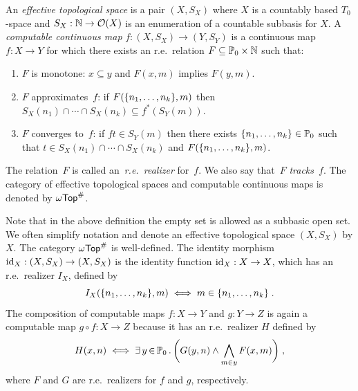 \begin{definition}
  \label{def:eff_top}%
  An \emph{effective topological space} is a pair $(X, S_X)$ where $X$
  is a countably based $T_0$-space and $S_X: \mathbb{N} \to \mathcal{O}(X)$ is
  an enumeration of a countable subbasis for $X$.
  A \emph{computable continuous map} $f: (X, S_X) \to (Y, S_Y)$ is a
  continuous map $f: X \to Y$ for which there exists an
  r.e.~relation $F \subseteq \mathbb{P}_0 \times \mathbb{N}$ such that:
  \begin{enumerate}
  \item
    $F$ is monotone: $x \subseteq y$ and $F(x, m)$ implies $F(y, m)$.
  \item
    $F$ approximates~$f$: if $F(\{n_1, \ldots, n_k\}, m)$ then
    $S_X(n_1) \cap \cdots \cap S_X(n_k) \subseteq
    f^{*}(S_Y(m))$.
  \item
    $F$ converges to~$f$: if $f t \in S_Y(m)$ then there exists
    $\{n_1, \ldots, n_k\} \in \mathbb{P}_0$ such that $t \in S_X(n_1)
    \cap \cdots \cap S_X(n_k)$ and $F(\{n_1, \ldots, n_k\},
    m)$.
  \end{enumerate}
  The relation~$F$ is called an~\emph{r.e.~realizer} for~$f$. We also
  say that~$F$ \emph{tracks}~$f$.
  The category of effective
  topological spaces and computable continuous maps is denoted by
  $\mathsf{\omega Top}^{\#}$.
\end{definition}

Note that in the above definition the empty set is allowed as a
subbasic open set. We often simplify notation and denote an effective
topological space $(X, S_X)$ by $X$. The category $\mathsf{\omega Top}^{\#}$ is
well-defined. The identity morphism $\mathrm{id}_X: (X, S_X) \to (X, S_X)$
is the identity function $\mathrm{id}_{X}: X \to X$, which has an
r.e.~realizer $I_X$, defined by
%
\begin{equation*}
  I_X(\{n_1, \ldots, n_k\}, m) \iff
  m \in \{n_1, \ldots, n_k\} \;.
\end{equation*}
%
The composition of computable maps $f: X \to Y$ and $g: Y \to Z$ is
again a computable map $g \circ f: X \to Z$ because it has an
r.e.~realizer $H$ defined by
%
\begin{equation*}
  H(x, n) \iff
  \exists\, y \,{\in}\, \mathbb{P}_0\,.\,\bigg( G(y, n) \land \bigwedge_{m \in y}
    F(x,m)\bigg) \;,
\end{equation*}
%
where $F$ and $G$ are r.e.~realizers for $f$ and $g$, respectively.

